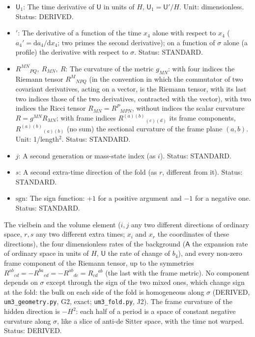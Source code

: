 \documentclass[
  10pt,
]{article}
\begin{document}
\begin{itemize}
  dimensionless. Status: DERIVED.
\item
  \(\mathsf{U}_1\): The time derivative of \(\mathsf{U}\) in units of
  \(H\), \(\mathsf{U}_1 = \mathsf{U}'/H\). Unit: dimensionless. Status:
  DERIVED.
\item
  \({}'\): The derivative of a function of the time \(x_4\) alone with
  respect to \(x_4\) (\(a_4' = \mathrm{d}a_4/\mathrm{d}x_4\); two primes
  the second derivative); on a function of \(\sigma\) alone (a profile)
  the derivative with respect to \(\sigma\). Status: STANDARD.
\item
  \(R^{MN}{}_{PQ},\ R_{MN},\ R\): The curvature of the metric
  \(g_{MN}\): with four indices the Riemann tensor \(R^M{}_{NPQ}\) (in
  the convention in which the commutator of two covariant derivatives,
  acting on a vector, is the Riemann tensor, with its last two indices
  those of the two derivatives, contracted with the vector), with two
  indices the Ricci tensor \(R_{MN} = R^P{}_{MPN}\), without indices the
  scalar curvature \(R = g^{MN}R_{MN}\); with frame indices
  \(R^{(a)(b)}{}_{(c)(d)}\) its frame components,
  \(R^{(a)(b)}{}_{(a)(b)}\) (no sum) the sectional curvature of the
  frame plane \((a, b)\). Unit: 1/length\(^2\). Status: STANDARD.
\item
  \(j\): A second generation or mass-state index (as \(i\)). Status:
  STANDARD.
\item
  \(s\): A second extra-time direction of the fold (as \(r\), different
  from it). Status: STANDARD.
\item
  \(\mathrm{sgn}\): The sign function: \(+1\) for a positive argument
  and \(-1\) for a negative one. Status: STANDARD.
\end{itemize}

The vielbein and the volume element (\(i, j\) any two different
directions of ordinary space, \(r, s\) any two different extra times;
\(x_i\) and \(x_r\) the coordinates of these directions), the four
dimensionless rates of the background (\(\mathsf{A}\) the expansion rate
of ordinary space in units of \(H\), \(\mathsf{U}\) the rate of change
of \(b_4\)), and every non-zero frame component of the Riemann tensor,
up to the symmetries
\(R^{ab}{}_{cd} = -R^{ba}{}_{cd} = -R^{ab}{}_{dc} = R_{cd}{}^{ab}\) (the
last with the frame metric). No component depends on \(\sigma\) except
through the sign of the two mixed ones, which change sign at the fold:
the bulk on each side of the fold is homogeneous along \(\sigma\)
(DERIVED, \texttt{um3\_geometry.py}, G2, exact; \texttt{um3\_fold.py},
J2). The frame curvature of the hidden direction is \(-H^2\): each half
of a period is a space of constant negative curvature along \(\sigma\),
like a slice of anti-de Sitter space, with the time not warped. Status:
DERIVED.
\end{document}
